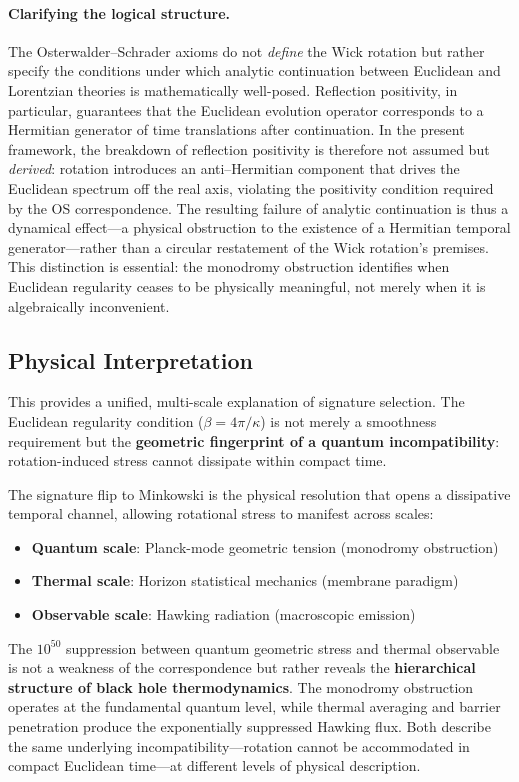 \documentclass[11pt]{article}
\begin{document}
\paragraph{Clarifying the logical structure.}
The Osterwalder--Schrader axioms do not \emph{define} the Wick rotation but rather specify the conditions under which analytic continuation between Euclidean and Lorentzian theories is mathematically well-posed.  Reflection positivity, in particular, guarantees that the Euclidean evolution operator corresponds to a Hermitian generator of time translations after continuation.  In the present framework, the breakdown of reflection positivity is therefore not assumed but \emph{derived}: rotation introduces an anti--Hermitian component that drives the Euclidean spectrum off the real axis, violating the positivity condition required by the OS correspondence.  The resulting failure of analytic continuation is thus a dynamical effect---a physical obstruction to the existence of a Hermitian temporal generator---rather than a circular restatement of the Wick rotation’s premises.  This distinction is essential: the monodromy obstruction identifies when Euclidean regularity ceases to be physically meaningful, not merely when it is algebraically inconvenient.

\subsection{Physical Interpretation}

This provides a unified, multi-scale explanation of signature selection. The Euclidean 
regularity condition ($\beta = 4\pi/\kappa$) is not merely a smoothness requirement 
but the \textbf{geometric fingerprint of a quantum incompatibility}: rotation-induced 
stress cannot dissipate within compact time. 

The signature flip to Minkowski is the physical resolution that opens a dissipative 
temporal channel, allowing rotational stress to manifest across scales:
\begin{itemize}
\item \textbf{Quantum scale}: Planck-mode geometric tension (monodromy obstruction)
\item \textbf{Thermal scale}: Horizon statistical mechanics (membrane paradigm)  
\item \textbf{Observable scale}: Hawking radiation (macroscopic emission)
\end{itemize}

The $10^{50}$ suppression between quantum geometric stress and thermal observable 
is not a weakness of the correspondence but rather reveals the \textbf{hierarchical 
structure of black hole thermodynamics}. The monodromy obstruction operates at the 
fundamental quantum level, while thermal averaging and barrier penetration produce 
the exponentially suppressed Hawking flux. Both describe the same underlying 
incompatibility---rotation cannot be accommodated in compact Euclidean time---at 
different levels of physical description.
\end{document}
